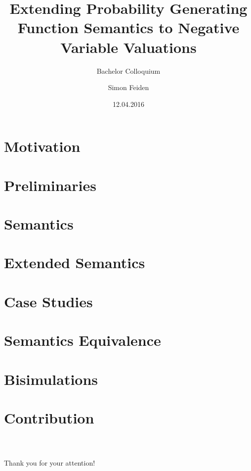 \documentclass{beamer}
\title{Extending Probability Generating Function Semantics to Negative Variable Valuations}
\subtitle{Bachelor Colloquium}
\date{12.04.2016}
\author{Simon Feiden}
\begin{document}
	
	
\maketitle



\section{Motivation}



\section{Preliminaries}



\section{Semantics}



\section{Extended Semantics}

 

\section{Case Studies}



\section{Semantics Equivalence}



\section{Bisimulations}



\section{Contribution}



\begin{frame}
	\frametitle{\ }
	\begin{center}
		\LARGE Thank you for your attention!
	\end{center}
\end{frame}


\begin{frame}
\end{frame}







\end{document}
